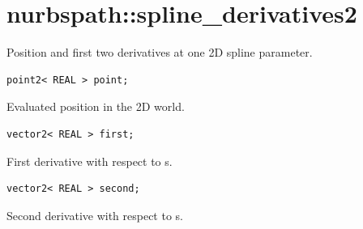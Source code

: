 \section{nurbspath::spline\_derivatives2}
Position and first two derivatives at one 2D spline parameter.
\par\noindent\begin{minipage}{\linewidth}
\begin{lstlisting}[style=apireference]
point2< REAL > point;
\end{lstlisting}
{\footnotesize Evaluated position in the 2D world.\par}
\end{minipage}\par\vspace{1pt}
\par\noindent\begin{minipage}{\linewidth}
\begin{lstlisting}[style=apireference]
vector2< REAL > first;
\end{lstlisting}
{\footnotesize First derivative with respect to s.\par}
\end{minipage}\par\vspace{1pt}
\par\noindent\begin{minipage}{\linewidth}
\begin{lstlisting}[style=apireference]
vector2< REAL > second;
\end{lstlisting}
{\footnotesize Second derivative with respect to s.\par}
\end{minipage}\par\vspace{1pt}
